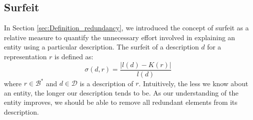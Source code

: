 
\subsection{Surfeit}

In Section \ref{sec:Definition_redundancy}, we introduced the concept of surfeit as a relative measure to quantify the unnecessary effort involved in explaining an entity using a particular description. The surfeit of a description $d$ for a representation $r$ is defined as:
\[
\sigma (d, r) = \frac{ | l(d) - K(r) |}{l(d)}
\]
where $r \in \mathcal{B}^\ast$ and $d \in \mathcal{D}$ is a description of $r$. Intuitively, the less we know about an entity, the longer our description tends to be. As our understanding of the entity improves, we should be able to remove all redundant elements from its description.

